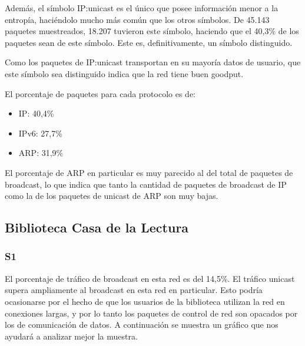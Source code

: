 Además, el símbolo IP:unicast es el único que posee información menor a la
entropía, haciéndolo mucho más común que los otros símbolos. De 45.143 paquetes
muestreados, 18.207 tuvieron este símbolo, haciendo que el 40,3\% de los paquetes
sean de este símbolo. Este es, definitivamente, un símbolo distinguido.

Como los paquetes de IP:unicast transportan en su mayoría datos de usuario,
que este símbolo sea distinguido indica que la red tiene buen goodput.


El porcentaje de paquetes para cada protocolo es de:
\begin{itemize}
	\item IP: 40,4\%
	\item IPv6: 27,7\%
	\item ARP: 31,9\%
\end{itemize}

El porcentaje de ARP en particular es muy parecido al del total de paquetes de
broadcast, lo que indica que tanto la cantidad de paquetes de broadcast de IP
como la de los paquetes de unicast de ARP son muy bajas.




\subsection{Biblioteca Casa de la Lectura}
\subsubsection{S1}

El porcentaje de tráfico de broadcast en esta red es del 14,5\%. El tráfico unicast supera ampliamente
al broadcast en esta red en particular. Esto podría ocasionarse por el hecho de que los
usuarios de la biblioteca utilizan la red en conexiones largas, y por lo tanto los paquetes
de control de red son opacados por los de comunicación de datos. A continuación se muestra un
gráfico que nos ayudará a analizar mejor la muestra.


